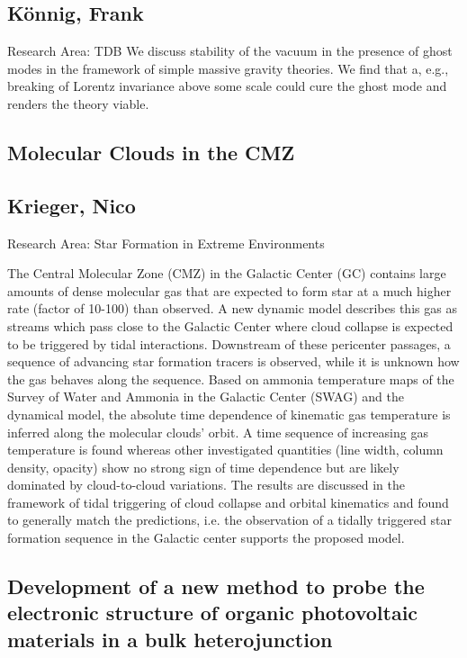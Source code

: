 \subsection*{\centering \large K\"onnig, Frank}
Research Area: TDB \newline
\noindent  We discuss stability of the vacuum in the presence of ghost modes in the framework of simple
massive gravity theories. We find that a, e.g., breaking of Lorentz invariance above some scale
could cure the ghost mode and renders the theory viable. 


\subsection*{\centering \large Molecular Clouds in the CMZ}
\subsection*{\centering \normalsize Krieger, Nico}
Research Area: Star Formation in Extreme Environments\newline

\noindent The Central Molecular Zone (CMZ) in the Galactic Center (GC) contains large amounts of dense molecular gas that are expected to form star at a much higher rate (factor of 10-100) than observed. A new dynamic model describes this gas as streams which pass close to the Galactic Center where cloud collapse is expected to be triggered by tidal interactions. Downstream of these pericenter passages, a sequence of advancing star formation tracers is observed, while it is unknown how the gas behaves along the sequence.\newline
Based on ammonia temperature maps of the Survey of Water and Ammonia in the Galactic Center (SWAG) and the dynamical model, the absolute time dependence of kinematic gas temperature is inferred along the molecular clouds’ orbit. A time sequence of increasing gas temperature is found whereas other investigated quantities (line width, column density, opacity) show no strong sign of time dependence but are likely dominated by cloud-to-cloud variations. The results are discussed in the framework of tidal triggering of cloud collapse and orbital kinematics and found to generally match the predictions, i.e. the observation of a tidally triggered star formation sequence in the Galactic center supports the proposed model.
\newpage
\subsection*{\centering \large Development of a new method to probe the electronic structure of organic photovoltaic materials in a bulk heterojunction}
